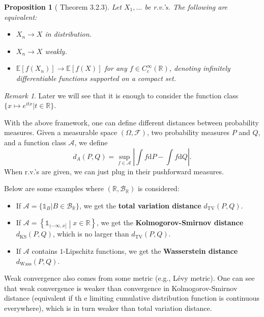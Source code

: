 \documentclass[openany]{book}
\newtheorem{proposition}{Proposition}[chapter]
\theoremstyle{definition}
\theoremstyle{remark}
\newtheorem*{remark}{Remark}
\begin{document}
\begin{proposition}[\cite{D10} Theorem 3.2.3]
    Let $X_1,\ldots$ be r.v.'s. The following are equivalent:
    \begin{itemize}
        \item $X_n\to X$ in distribution.
        \item $X_n\to X$ weakly.
        \item $\mathbb{E}\left[f(X_n)\right]\to \mathbb{E}\left[f(X)\right]$ for any $f\in C_c^{\infty}(\mathbb{R})$, denoting infinitely differentiable functions supported on a compact set.
    \end{itemize}
\end{proposition}
\begin{remark}
    Later we will see that it is enough to consider the function class $\{x\mapsto e^{itx}|t\in \mathbb{R}\}$.
\end{remark}

With the above framework, one can define different distances between probability measures. Given a measurable space $(\Omega,\mathcal{F})$, two probability measures $P$ and $Q$, and a function class $\mathcal{A}$, we define
\begin{equation*}
    d_A(P,Q)=\sup_{f\in \mathcal{\mathcal{A}}}\left|\int f \mathrm{d}P-\int f \mathrm{d}Q\right|.
\end{equation*}
When r.v.'s are given, we can just plug in their pushforward measures.

Below are some examples where $(\mathbb{R},\mathcal{B}_{\mathbb{R}})$ is considered:
\begin{itemize}
    \item If $\mathcal{A}=\{\mathds{1}_B|B\in \mathcal{B}_{\mathbb{R}}\}$, we get the \textbf{total variation distance} $d_{\mathrm{TV}}(P,Q)$.

    \item If $\mathcal{A}=\left\{\mathds{1}_{(-\infty,x]}\middle|x\in \mathbb{R}\right\}$, we get the \textbf{Kolmogorov-Smirnov distance} $d_{\mathrm{KS}}(P,Q)$, which is no larger than $d_{\mathrm{TV}}(P,Q)$.

    \item If $\mathcal{A}$ contains $1$-Lipschitz functions, we get the \textbf{Wasserstein distance} $d_{\mathrm{Wass}}(P,Q)$.
\end{itemize}

Weak convergence also comes from some metric (e.g., L\'{e}vy metric). One can see that weak convergence is weaker than convergence in Kolmogorov-Smirnov distance (equivalent if th e limiting cumulative distribution function is continuous everywhere), which is in turn weaker than total variation distance.
\end{document}
